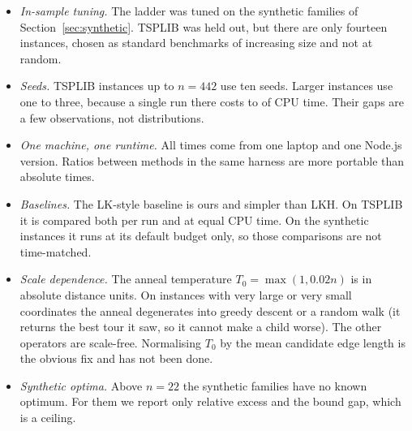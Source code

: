 \begin{itemize}\itemsep2pt
\item \emph{In-sample tuning.} The ladder was tuned on the synthetic families of
Section~\ref{sec:synthetic}. TSPLIB was held out, but there are only fourteen instances, chosen as
standard  benchmarks of increasing size and not at random.
\item \emph{Seeds.} TSPLIB instances up to $n=442$ use ten seeds. Larger instances use one to three,
because a single  run there costs  to  of CPU time. Their gaps are a few
observations, not distributions.
\item \emph{One machine, one runtime.} All times come from one laptop and one Node.js version. Ratios
between methods in the same harness are more portable than absolute times.
\item \emph{Baselines.} The LK-style baseline is ours and simpler than LKH. On TSPLIB it is compared
both per run and at equal CPU time. On the synthetic instances it runs at its default budget only, so
those comparisons are not time-matched.
\item \emph{Scale dependence.} The anneal temperature $T_0=\max(1,0.02n)$ is in absolute distance
units. On instances with very large or very small coordinates the anneal degenerates into greedy
descent or a random walk (it returns the best tour it saw, so it cannot make a child worse). The other
operators are scale-free. Normalising $T_0$ by the mean candidate edge length is the obvious fix and
has not been done.
\item \emph{Synthetic optima.} Above $n=22$ the synthetic families have no known optimum. For them
we report only relative excess and the bound gap, which is a ceiling.
\end{itemize}
